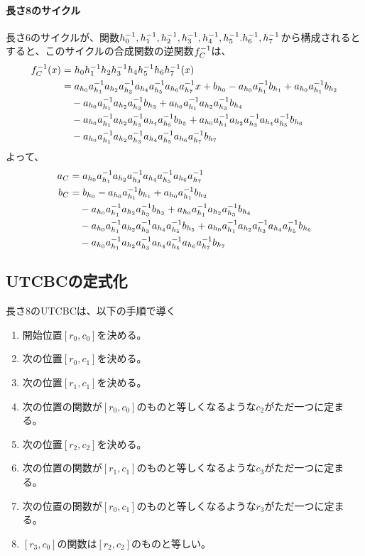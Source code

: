 \documentclass[a4paper,11pt,dvipdfmx]{jsarticle}
\theoremstyle{definition}
\begin{document}
\paragraph{長さ8のサイクル}
長さ6のサイクルが、関数$h_0^{-1}, h_1^{-1}, h_2^{-1}, h_3^{-1}, h_4^{-1}, h_5^{-1}. h_6^{-1}, h_7^{-1}$から構成されるとすると、このサイクルの合成関数の逆関数$f_C^{-1}$は、
\begin{align}
  f_C^{-1}(x) &= h_0 h_1^{-1} h_2 h_3^{-1} h_4 h_5^{-1} h_6 h_7^{-1}(x)\\
  &= a_{h_0}a_{h_1}^{-1} a_{h_2}a_{h_3}^{-1} a_{h_4} a_{h_5}^{-1} a_{h_6} a_{h_7}^{-1} x + b_{h_0} - a_{h_0}a_{h_1}^{-1} b_{h_1} + a_{h_0}a_{h_1}^{-1} b_{h_2}\\
  &\quad - a_{h_0}a_{h_1}^{-1} a_{h_2}a_{h_3}^{-1} b_{h_3} + a_{h_0}a_{h_1}^{-1} a_{h_2}a_{h_3}^{-1} b_{h_4}\\
  &\quad - a_{h_0}a_{h_1}^{-1} a_{h_2}a_{h_3}^{-1} a_{h_4}a_{h_5}^{-1} b_{h_5} + a_{h_0}a_{h_1}^{-1} a_{h_2}a_{h_3}^{-1} a_{h_4}a_{h_5}^{-1} b_{h_6}\\
  &\quad - a_{h_0}a_{h_1}^{-1} a_{h_2}a_{h_3}^{-1} a_{h_4}a_{h_5}^{-1} a_{h_6}a_{h_7}^{-1} b_{h_7}
\end{align}
よって、
\begin{align}
  a_C &= a_{h_0}a_{h_1}^{-1} a_{h_2}a_{h_3}^{-1} a_{h_4} a_{h_5}^{-1} a_{h_6} a_{h_7}^{-1}\\
  b_C &= b_{h_0} - a_{h_0}a_{h_1}^{-1} b_{h_1} + a_{h_0}a_{h_1}^{-1} b_{h_2}\\
  &\quad - a_{h_0}a_{h_1}^{-1} a_{h_2}a_{h_3}^{-1} b_{h_3} + a_{h_0}a_{h_1}^{-1} a_{h_2}a_{h_3}^{-1} b_{h_4}\\
  &\quad - a_{h_0}a_{h_1}^{-1} a_{h_2}a_{h_3}^{-1} a_{h_4}a_{h_5}^{-1} b_{h_5} + a_{h_0}a_{h_1}^{-1} a_{h_2}a_{h_3}^{-1} a_{h_4}a_{h_5}^{-1} b_{h_6}\\
  &\quad - a_{h_0}a_{h_1}^{-1} a_{h_2}a_{h_3}^{-1} a_{h_4}a_{h_5}^{-1} a_{h_6}a_{h_7}^{-1} b_{h_7}
\end{align}

\subsection{UTCBCの定式化}
長さ8のUTCBCは、以下の手順で導く
\begin{enumerate}
  \item 開始位置$[r_0,c_0]$を決める。
  \item 次の位置$[r_0,c_1]$を決める。
  \item 次の位置$[r_1,c_1]$を決める。
  \item 次の位置の関数が$[r_0,c_0]$のものと等しくなるような$c_2$がただ一つに定まる。
  \item 次の位置$[r_2,c_2]$を決める。
  \item 次の位置の関数が$[r_1,c_1]$のものと等しくなるような$c_3$がただ一つに定まる。
  \item 次の位置の関数が$[r_0,c_1]$のものと等しくなるような$r_3$がただ一つに定まる。
  \item $[r_3,c_0]$の関数は$[r_2,c_2]$のものと等しい。
\end{enumerate}
\end{document}
